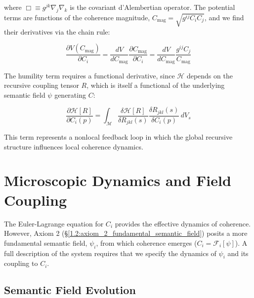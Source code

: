 where \(\Box \equiv g^{jk}\nabla_j \nabla_k\) is the covariant d'Alembertian operator. The potential terms are functions of the coherence magnitude, \(C_{\text{mag}} = \sqrt{g^{ij} C_i C_j}\), and we find their derivatives via the chain rule:

\begin{equation}
\frac{\partial V(C_{\mathrm{mag}})}{\partial C_i} = \frac{dV}{dC_{\mathrm{mag}}} \frac{\partial C_{\mathrm{mag}}}{\partial C_i} = \frac{dV}{dC_{\mathrm{mag}}} \frac{g^{ij} C_j}{C_{\mathrm{mag}}}
\end{equation}

The humility term requires a functional derivative, since \(\mathcal{H}\) depends on the recursive coupling tensor \(R\), which is itself a functional of the underlying semantic field \(\psi\) generating \(C\):

\begin{equation}
\frac{\partial \mathcal{H}[R]}{\partial C_i(p)} = \int_{\mathcal{M}} \frac{\delta \mathcal{H}[R]}{\delta R_{jkl}(s)} \frac{\delta R_{jkl}(s)}{\delta C_i(p)} \, dV_s
\end{equation}

This term represents a nonlocal feedback loop in which the global recursive structure influences local coherence dynamics.


\section{Microscopic Dynamics and Field Coupling}
\label{6.5:microscopic_dynamics_and_field_coupling}

The Euler-Lagrange equation for \(C_i\) provides the effective dynamics of coherence. However, Axiom 2 (\S\ref{1.2:axiom_2_fundamental_semantic_field}) posits a more fundamental semantic field, \(\psi_i\), from which coherence emerges (\(C_i = \mathcal{F}_i[\psi]\)). A full description of the system requires that we specify the dynamics of \(\psi_i\) and its coupling to \(C_i\).


\subsection{Semantic Field Evolution}
\label{6.5.1:semantic_field_evolution}

